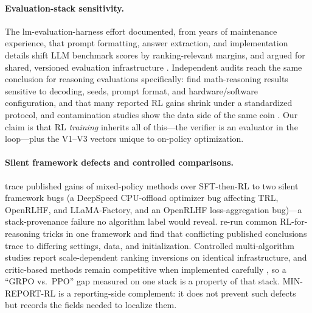 \paragraph{Evaluation-stack sensitivity.} The lm-evaluation-harness effort
documented, from years of maintenance experience, that prompt formatting,
answer extraction, and implementation details shift LLM benchmark scores by
ranking-relevant margins, and argued for shared, versioned evaluation
infrastructure \citep{biderman2024lessons}. Independent audits reach the same
conclusion for reasoning evaluations specifically: \citet{hochlehnert2025sober}
find math-reasoning results sensitive to decoding, seeds, prompt format, and
hardware/software configuration, and that many reported RL gains shrink under a
standardized protocol, and contamination studies show the data side of
the same coin \citep{zhang2024gsm1k, riddell2024contamination}. Our claim is
that RL \emph{training} inherits all of this---the verifier is an evaluator
in the loop---plus the V1--V3 vectors unique to on-policy optimization.

\paragraph{Silent framework defects and controlled comparisons.}
\citet{limozin2026sftrl} trace published gains of mixed-policy methods over
SFT-then-RL to two silent framework bugs (a DeepSpeed CPU-offload optimizer bug
affecting TRL, OpenRLHF, and LLaMA-Factory, and an OpenRLHF loss-aggregation
bug)---a stack-provenance failure no algorithm label would reveal.
\citet{liu2025tricks} re-run common RL-for-reasoning tricks in one framework
and find that conflicting published conclusions trace to differing
settings, data, and initialization. Controlled multi-algorithm studies
\citep{li2026oxrl} report scale-dependent ranking inversions on identical
infrastructure, and critic-based methods remain competitive when implemented
carefully \citep{kazemnejad2025vineppo, liu2025asyppo}, so a ``GRPO vs.\ PPO''
gap measured on one stack is a property of that stack. MIN-REPORT-RL is a
reporting-side complement: it does not prevent such defects but records the
fields needed to localize them.

